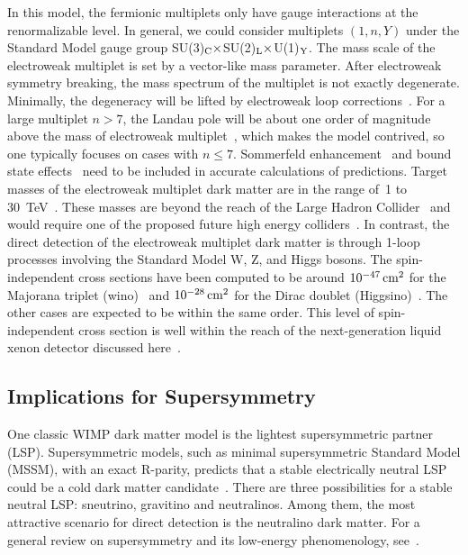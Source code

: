 In this model, the fermionic multiplets only have gauge interactions at the renormalizable level. In general, we could consider multiplets $(1, n, Y)$ under the Standard Model gauge group SU(3)$_{\rm C} \times$SU(2)$_{\rm L} \times$U(1)$_{\rm Y}$. The mass scale of the electroweak multiplet is set by a vector-like mass parameter. After electroweak symmetry breaking, the mass spectrum of the multiplet is not exactly degenerate. Minimally, the degeneracy will be lifted by electroweak loop corrections~\cite{Thomas:1998wy,Buckley:2009kv,Cirelli:2005uq,Cirelli:2009uv,Ibe:2012sx}. For a large multiplet $n > 7$, the Landau pole will be about one order of magnitude above the mass of electroweak multiplet~\cite{DiLuzio:2015oha}, which makes the model contrived, so one typically focuses on cases with $n\leq 7$. Sommerfeld enhancement~\cite{Belotsky:2005dk,Hisano:2006nn,Cirelli:2007xd} and bound state effects~\cite{An:2016gad,Mitridate:2017izz} need to be included in accurate calculations of predictions. Target masses of the electroweak multiplet dark matter are in the range of~1 to 30~TeV~\cite{DiLuzio:2018jwd,DelNobile:2015bqo,Mitridate:2017izz}. These masses are beyond the reach of the Large Hadron Collider~\cite{Low:2014cba,Han:2018wus,CidVidal:2018eel} and would require one of the proposed future high energy colliders~\cite{Strategy:2019vxc,Han:2020uak}. In contrast, the direct detection of the electroweak multiplet dark matter is through 1-loop processes involving the Standard Model W, Z, and Higgs bosons. The spin-independent cross sections have been computed to be around $10^{-47}\, \mathrm{cm^2}$ for the Majorana triplet (wino)~\cite{Hisano:2015rsa} and $10^{-28}\, \mathrm{cm^2}$ for the Dirac doublet (Higgsino)~\cite{Hill:2013hoa}. The other cases are expected to be within the same order. This level of spin-independent cross section is well within the reach of the next-generation liquid xenon detector discussed here~\cite{He:2016mls,Thornberry:2021ych}. 

\subsection{Implications for Supersymmetry} 

One classic WIMP dark matter model is the lightest supersymmetric partner (LSP). Supersymmetric models, such as minimal supersymmetric Standard Model (MSSM), with an exact R-parity, predicts that a stable electrically neutral LSP could be a cold dark matter candidate~\cite{Jungman:1995df}. There are three possibilities for a stable neutral LSP: sneutrino, gravitino and neutralinos. Among them, the most attractive scenario for direct detection is the neutralino dark matter. For a general review on supersymmetry and its low-energy phenomenology, see~\cite{Martin:1997ns}. 

